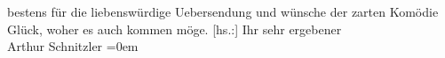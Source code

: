 \begin{ledgroupsized}[t]{13cm}
               bestens für die liebenswürdige Uebersendung und wünsche der zarten Komödie Glück,
               woher es auch kommen möge.\pend
           \pstart
           {[}hs.:{]} Ihr sehr ergebener{\\[\baselineskip]}Arthur Schnitzler\pend
           \leftskip=0em{}\endnumbering{}\end{ledgroupsized}  \newcommand{\dateiname}{L01832}\newcommand{\titel}{Arthur Schnitzler an Robert Adam, 20. 3. 1909}\newcommand{\editorInnen}{Martin Anton Müller und Gerd-Hermann Susen}
      
